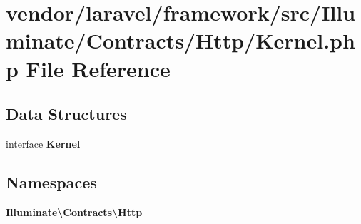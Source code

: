 \section{vendor/laravel/framework/src/\+Illuminate/\+Contracts/\+Http/\+Kernel.php File Reference}
\label{vendor_2laravel_2framework_2src_2_illuminate_2_contracts_2_http_2_kernel_8php}
\subsection*{Data Structures}
\begin{DoxyCompactItemize}
\item 
interface {\bf Kernel}
\end{DoxyCompactItemize}
\subsection*{Namespaces}
\begin{DoxyCompactItemize}
\item 
 {\bf Illuminate\textbackslash{}\+Contracts\textbackslash{}\+Http}
\end{DoxyCompactItemize}
